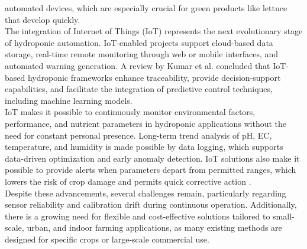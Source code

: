 automated devices, which are especially crucial for green products like lettuce that develop
quickly.\\[10pt]
The integration of Internet of Things (IoT) represents the next evolutionary stage of
hydroponic automation. IoT-enabled projects support cloud-based data storage, real-time
remote monitoring through web or mobile interfaces, and automated warning generation.
A review by Kumar et al. \cite{kumar2021} concluded that IoT-based hydroponic frameworks
enhance traceability, provide decision-support capabilities, and facilitate the integration
of predictive control techniques, including machine learning models.\\[10pt]
IoT makes it possible to continuously monitor environmental factors, performance,
and nutrient parameters in hydroponic applications without the need for constant personal
presence. Long-term trend analysis of pH, EC, temperature, and humidity is made possible
by data logging, which supports data-driven optimization and early anomaly detection.
IoT solutions also make it possible to provide alerts when parameters depart from permitted
ranges, which lowers the risk of crop damage and permits quick corrective action \cite{kumar2021}.\\[10pt]
Despite these advancements, several challenges remain, particularly regarding sensor reliability
and calibration drift during continuous operation. Additionally, there is a growing need for
flexible and cost-effective solutions tailored to small-scale, urban, and indoor farming
applications, as many existing methods are designed for specific crops or large-scale commercial
use.

